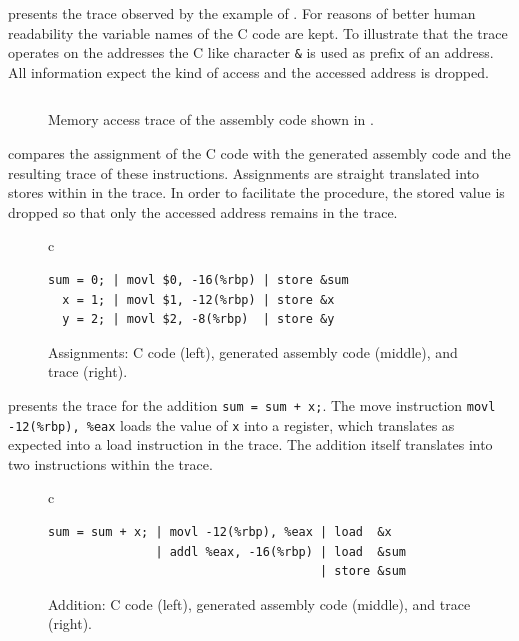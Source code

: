 \documentclass[onecolumn, openright, master, english, signatures]{dbrgrptt}
\begin{document}
 presents the \ac{trace} observed by the example of .
For reasons of better human readability the variable names of the C code are kept.
To illustrate that the \ac{trace} operates on the addresses the C like character \texttt{\&} is used as prefix of an address.
All information expect the kind of access and the accessed address is dropped.

\begin{figure}[!ht]
  \centering
  \begin{tabular}{c}
  
  \end{tabular}
  \caption{Memory access trace of the assembly code shown in .}
  \label{fig:mat-example-trace}
\end{figure}

 compares the assignment of the C code with the generated assembly code and the resulting \ac{trace} of these instructions.
Assignments are straight translated into stores within in the \ac{trace}.
In order to facilitate the procedure, the stored value is dropped so that only the accessed address remains in the \ac{trace}.

\begin{figure}[!ht]
  \centering
  \begin{tabular}{c}
  \begin{lstlisting}
sum = 0; | movl $0, -16(%rbp) | store &sum
  x = 1; | movl $1, -12(%rbp) | store &x
  y = 2; | movl $2, -8(%rbp)  | store &y
  \end{lstlisting}
  \end{tabular}
  \caption{Assignments: C code (left), generated assembly code (middle), and \ac{trace} (right).}
  \label{fig:mat-example-comp-assignment-all}
\end{figure}

 presents the \ac{trace} for the addition \texttt{sum = sum + x;}. The move instruction \texttt{movl -12(\%rbp), \%eax} loads the value of \texttt{x} into a register, which translates as expected into a load instruction in the \ac{trace}.
The addition itself translates into two instructions within the \ac{trace}.

\begin{figure}[!ht]
  \centering
  \begin{tabular}{c}
  \begin{lstlisting}
sum = sum + x; | movl -12(%rbp), %eax | load  &x
               | addl %eax, -16(%rbp) | load  &sum
                                      | store &sum
  \end{lstlisting}
  \end{tabular}
  \caption{Addition: C code (left), generated assembly code (middle), and \ac{trace} (right).}
  \label{fig:mat-example-comp-addition-all}
\end{figure}
\end{document}
